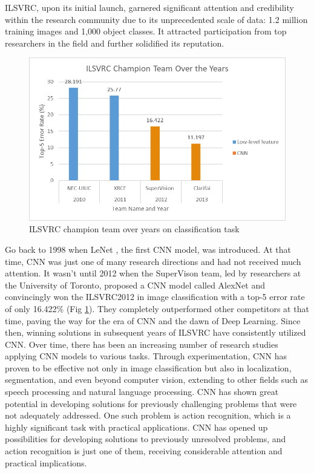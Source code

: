 \documentclass[conference]{IEEEtran}
\begin{document}
ILSVRC, upon its initial launch, garnered significant attention and credibility within the research community due to its unprecedented scale of data: 1.2 million training images and 1,000 object classes. It attracted participation from top researchers in the field and further solidified its reputation.

\begin{figure} [h]
	\centering
	\includegraphics[width=1.\linewidth]{fig_info/fig1/ILSVRCChampionTeamOvertheYears}
	\caption{ILSVRC champion team over years on classification task}
	\label{fig:ilsvrcchampionteamovertheyears}
\end{figure}

Go back to 1998 when LeNet \cite{LeNet}, the first CNN model, was introduced. At that time, CNN was just one of many research directions and had not received much attention. It wasn't until 2012 when the SuperVison team, led by researchers at the University of Toronto, proposed a CNN model called AlexNet and convincingly won the ILSVRC2012 in image classification with a top-5 error rate of only 16.422\% (Fig \ref{fig:ilsvrcchampionteamovertheyears}). They completely outperformed other competitors at that time, paving the way for the era of CNN and the dawn of Deep Learning. Since then, winning solutions in subsequent years of ILSVRC have consistently utilized CNN. Over time, there has been an increasing number of research studies applying CNN models to various tasks. Through experimentation, CNN has proven to be effective not only in image classification but also in localization, segmentation, and even beyond computer vision, extending to other fields such as speech processing and natural language processing. CNN has shown great potential in developing solutions for previously challenging problems that were not adequately addressed. One such problem is action recognition, which is a highly significant task with practical applications. CNN has opened up possibilities for developing solutions to previously unresolved problems, and action recognition is just one of them, receiving considerable attention and practical implications.
\end{document}
